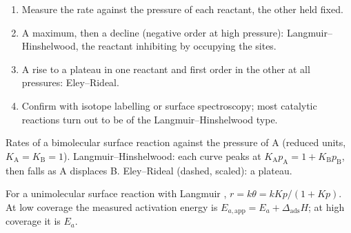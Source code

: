 \begin{method}\label{met:b3:surfaces-catalysis:mechanism-from-rate}
\begin{enumerate}
  \item Measure the rate against the pressure of each reactant, the other held
        fixed.
  \item A maximum, then a decline (negative order at high pressure):
        Langmuir--Hinshelwood, the reactant inhibiting by occupying the sites.
  \item A rise to a plateau in one reactant and first order in the other at all
        pressures: Eley--Rideal.
  \item Confirm with isotope labelling or surface spectroscopy; most catalytic
        reactions turn out to be of the Langmuir--Hinshelwood type.
\end{enumerate}
\end{method}

\begin{omfigure}

{\small Rates of a bimolecular surface reaction against the pressure of A
(reduced units, $K_{\mathrm A} = K_{\mathrm B} = 1$). Langmuir--Hinshelwood: each curve peaks at $K_{\mathrm A}p_{\mathrm A} =
1 + K_{\mathrm B}p_{\mathrm B}$, then falls as A displaces B. Eley--Rideal (dashed, scaled): a plateau.}
\end{omfigure}

\begin{proposition}\label{prop:b3:surfaces-catalysis:apparent-ea}
For a unimolecular surface reaction with Langmuir , $r = k\theta = kKp/(1 + Kp)$.
At low coverage the measured activation energy is $E_{a,\mathrm{app}} = E_a + \Delta_{\mathrm{ads}}H$; at
high coverage it is $E_a$.
\end{proposition}


